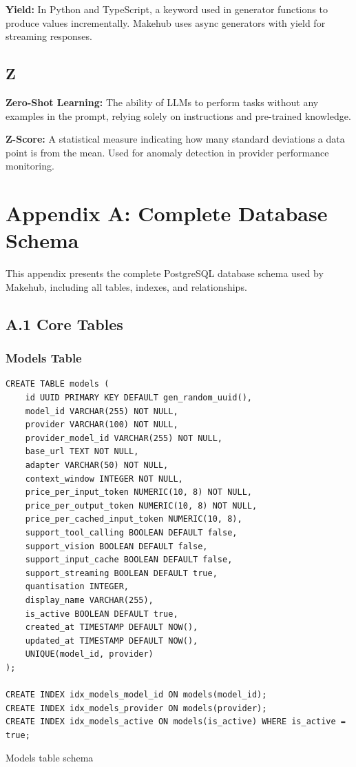 \documentclass[english]{article}
\begin{document}
\textbf{Yield:} In Python and TypeScript, a keyword used in generator functions to produce values incrementally. Makehub uses async generators with yield for streaming responses.

\subsection*{Z}

\textbf{Zero-Shot Learning:} The ability of LLMs to perform tasks without any examples in the prompt, relying solely on instructions and pre-trained knowledge.

\textbf{Z-Score:} A statistical measure indicating how many standard deviations a data point is from the mean. Used for anomaly detection in provider performance monitoring.

\newpage
\section*{Appendix A: Complete Database Schema}

This appendix presents the complete PostgreSQL database schema used by Makehub, including all tables, indexes, and relationships.

\subsection*{A.1 Core Tables}

\subsubsection*{Models Table}

\begin{listing}[H]
\begin{verbatim}
CREATE TABLE models (
    id UUID PRIMARY KEY DEFAULT gen_random_uuid(),
    model_id VARCHAR(255) NOT NULL,
    provider VARCHAR(100) NOT NULL,
    provider_model_id VARCHAR(255) NOT NULL,
    base_url TEXT NOT NULL,
    adapter VARCHAR(50) NOT NULL,
    context_window INTEGER NOT NULL,
    price_per_input_token NUMERIC(10, 8) NOT NULL,
    price_per_output_token NUMERIC(10, 8) NOT NULL,
    price_per_cached_input_token NUMERIC(10, 8),
    support_tool_calling BOOLEAN DEFAULT false,
    support_vision BOOLEAN DEFAULT false,
    support_input_cache BOOLEAN DEFAULT false,
    support_streaming BOOLEAN DEFAULT true,
    quantisation INTEGER,
    display_name VARCHAR(255),
    is_active BOOLEAN DEFAULT true,
    created_at TIMESTAMP DEFAULT NOW(),
    updated_at TIMESTAMP DEFAULT NOW(),
    UNIQUE(model_id, provider)
);

CREATE INDEX idx_models_model_id ON models(model_id);
CREATE INDEX idx_models_provider ON models(provider);
CREATE INDEX idx_models_active ON models(is_active) WHERE is_active = true;
\end{verbatim}
\caption{Models table schema}
\end{listing}
\end{document}
